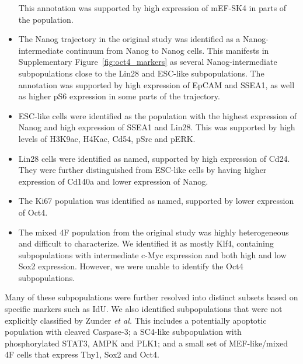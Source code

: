 \documentclass{article}
\begin{document}
\begin{itemize}
        This annotation was supported by high expression of mEF-SK4 in parts of the population.
    \item The Nanog\hi{} trajectory in the original study was identified as a Nanog-intermediate continuum from Nanog\lo{} to Nanog\hi{} cells.
        This manifests in Supplementary Figure~\ref{fig:oct4_markers} as several Nanog-intermediate subpopulations close to the Lin28\hi{} and ESC-like subpopulations.
        The annotation was supported by high expression of EpCAM and SSEA1, as well as higher pS6 expression in some parts of the trajectory.
    \item ESC-like cells were identified as the population with the highest expression of Nanog and high expression of SSEA1 and Lin28.
        This was supported by high levels of H3K9ac, H4Kac, Cd54, pSrc and pERK.
    \item Lin28\hi{} cells were identified as named, supported by high expression of Cd24.
They were further distinguished from ESC-like cells by having higher expression of Cd140a and lower expression of Nanog.
    \item The Ki67\hi{} population was identified as named, supported by lower expression of Oct4.
    \item The mixed 4F population from the original study was highly heterogeneous and difficult to characterize.
We identified it as mostly Klf4\lo{}, containing subpopulations with intermediate c-Myc expression and both high and low Sox2 expression.
However, we were unable to identify the Oct4\lo{} subpopulations.
\end{itemize}
Many of these subpopulations were further resolved into distinct subsets based on specific markers such as IdU.
We also identified subpopulations that were not explicitly classified by Zunder \emph{et al.}
This includes a potentially apoptotic population with cleaved Caspase-3;
    a SC4-like subpopulation with phosphorylated STAT3, AMPK and PLK1;
    and a small set of MEF-like/mixed 4F cells that express Thy1, Sox2 and Oct4.
\end{document}
